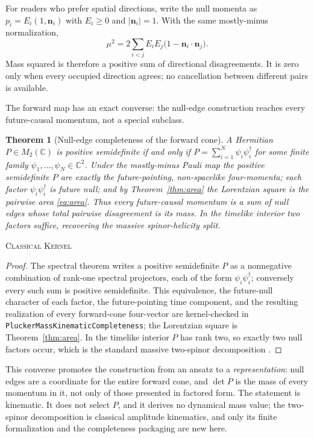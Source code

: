 \documentclass[11pt]{article}
\newcommand{\Kernel}{\textcolor{kernelcolor}{\textsc{Kernel}}}
\newcommand{\Classical}{\textcolor{classicalcolor}{\textsc{Classical}}}
\newcommand{\C}{\mathbb{C}}
\newtheorem{theorem}{Theorem}[section]
\begin{document}
For readers who prefer spatial directions, write the null momenta as
$p_i=E_i(1,\mathbf n_i)$ with $E_i\geq0$ and $|\mathbf n_i|=1$.  With the same
mostly-minus normalization,
\begin{equation}\label{eq:angular}
 \mu^2
 =2\sum_{i<j}E_iE_j\bigl(1-\mathbf n_i\mathbin{\cdot}\mathbf n_j\bigr).
\end{equation}
Mass squared is therefore a positive sum of directional disagreements.  It is
zero only when every occupied direction agrees; no cancellation between
different pairs is available.

The forward map has an exact converse: the null-edge construction reaches every
future-causal momentum, not a special subclass.

\begin{theorem}[Null-edge completeness of the forward cone]\label{thm:completeness}
A Hermitian $P\in M_2(\C)$ is positive semidefinite if and only if
$P=\sum_{i=1}^{N}\psi_i\psi_i^\dagger$ for some finite family
$\psi_1,\dots,\psi_N\in\C^2$.  Under the mostly-minus Pauli map the positive
semidefinite $P$ are exactly the future-pointing, non-spacelike four-momenta; each
factor $\psi_i\psi_i^\dagger$ is future null; and by Theorem~\ref{thm:area} the
Lorentzian square is the pairwise area \eqref{eq:area}.  Thus every future-causal
momentum is a sum of null edges whose total pairwise disagreement is its mass.  In the
timelike interior two factors suffice, recovering the massive spinor-helicity split.
\end{theorem}
\noindent\Classical{} \Kernel{}

\begin{proof}
The spectral theorem writes a positive semidefinite $P$ as a nonnegative combination of
rank-one spectral projectors, each of the form $\psi_i\psi_i^\dagger$; conversely every
such sum is positive semidefinite.  This equivalence, the future-null character of each
factor, the future-pointing time component, and the resulting realization of every
forward-cone four-vector are kernel-checked in
\texttt{PluckerMassKinematicCompleteness}; the Lorentzian square is
Theorem~\ref{thm:area}.  In the timelike interior $P$ has rank two, so exactly two null
factors occur, which is the standard massive two-spinor decomposition
\cite{ArkaniHamedMassive,DittmaierWvdW}.
\end{proof}

This converse promotes the construction from an ansatz to a \emph{representation}: null
edges are a coordinate for the entire forward cone, and $\det P$ is the mass of every
momentum in it, not only of those presented in factored form.  The statement is
kinematic.  It does not select $P$, and it derives no dynamical mass value; the
two-spinor decomposition is classical amplitude kinematics, and only its finite
formalization and the completeness packaging are new here.
\end{document}
